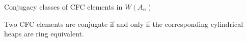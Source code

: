 \documentclass[9pt]{beamer}
\newcommand{\CFC}{\mathrm{CFC}}
\newcommand\xxaxis{0}
\newcommand\yyaxis{90}
\newcommand\sq[2]{
    \fill[fill=gray!25, draw=black, rounded corners, line width=1pt, shift={(\xxaxis:#1)}, shift={(\yyaxis:#2)}] 
    (0,0) -- (1,0) -- (1,-1) -- (0,-1) -- cycle; }
\begin{document}

\begin{frame}{Conjugacy classes of CFC elements in $W(A_n)$}
\begin{theorem}[Fox] Two CFC elements are conjugate if and only if the corresponding cylindrical heaps are ring equivalent.
\end{theorem}
%
%
\end{frame}
\end{document}
